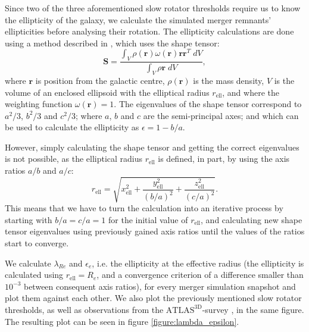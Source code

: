\documentclass[english, oneside]{HYgradu}
\begin{document}
Since two of the three aforementioned slow rotator thresholds require us to know the ellipticity of the galaxy, we calculate the simulated merger remnants' ellipticities before analysing their rotation. The ellipticity calculations are done using a method described in \cite{Zemp2011}, which uses the shape tensor:
\begin{equation}
\mathbf{S} = \frac{\int_V \rho(\mathbf{r}) \omega(\mathbf{r}) \mathbf{r} \mathbf{r}^T \; dV }{\int_V \rho{\mathbf{r}} \; dV},
\end{equation}
where $\mathbf{r}$ is position from the galactic centre, $\rho(\mathbf{r})$ is the mass density, $V$ is the volume of an enclosed ellipsoid with the elliptical radius $r_\mathrm{ell}$, and where the weighting function $\omega(\mathbf{r}) = 1$. The eigenvalues of the shape tensor correspond to $a^2/3$, $b^2/3$ and $c^2/3$; where $a$, $b$ and $c$ are the semi-principal axes; and which can be used to calculate the ellipticity as $\epsilon = 1 - b/a$. 

However, simply calculating the shape tensor and getting the correct eigenvalues is not possible, as the elliptical radius $r_\mathrm{ell}$ is defined, in part, by using the axis ratios $a/b$ and $a/c$:
\begin{equation}
r_\mathrm{ell} = \sqrt{x_\mathrm{ell}^2 + \frac{y_\mathrm{ell}^2}{(b/a)^2} + \frac{z_\mathrm{ell}^2}{(c/a)^2}}.
\end{equation}
This means that we have to turn the calculation into an iterative process by starting with $b/a = c/a = 1$ for the initial value of $r_\mathrm{ell}$, and calculating new shape tensor eigenvalues using previously gained axis ratios until the values of the ratios start to converge. 

We calculate $\lambda_{Re}$ and $\epsilon_e$, i.e. the ellipticity at the effective radius (the ellipticity is calculated using $r_\mathrm{ell} = R_e$, and a convergence criterion of a difference smaller than $10^{-3}$ between consequent axis ratios), for every merger simulation snapshot and plot them against each other. We also plot the previously mentioned slow rotator thresholds, as well as observations from the $\mathrm{ATLAS^{3D}}$-survey \citep{Cappellari2011}, in the same figure. The resulting plot can be seen in figure \ref{figure:lambda_epsilon}. 
\end{document}
